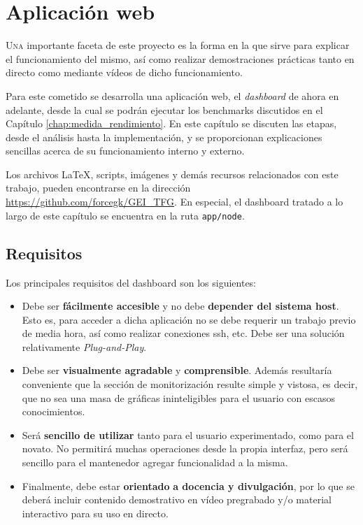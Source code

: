 \chapter{Aplicación web}
\label{chap:aplicacion_web}

\lettrine{U}{na} importante faceta de este proyecto es la forma en la que sirve para explicar el funcionamiento del mismo, así como realizar demostraciones prácticas tanto en directo como mediante vídeos de dicho funcionamiento.

Para este cometido se desarrolla una aplicación web, el \textit{dashboard} de ahora en adelante, desde la cual se podrán ejecutar los benchmarks discutidos en el Capítulo \ref{chap:medida_rendimiento}. En este capítulo se discuten las etapas, desde el análisis hasta la implementación, y se proporcionan explicaciones sencillas acerca de su funcionamiento interno y externo.

Los archivos \LaTeX, scripts, imágenes y demás recursos relacionados con este trabajo, pueden encontrarse en la dirección \url{https://github.com/forcegk/GEI_TFG}. En especial, el dashboard tratado a lo largo de este capítulo se encuentra en la ruta \texttt{app/node}. 

\section{Requisitos}
Los principales requisitos del dashboard son los siguientes:

\begin{itemize}
    \item Debe ser \textbf{fácilmente accesible} y no debe \textbf{depender del sistema host}. Esto es, para acceder a dicha aplicación no se debe requerir un trabajo previo de media hora, así como realizar conexiones \acrshort{ssh}, etc. Debe ser una solución relativamente \textit{Plug-and-Play}.
    \item Debe ser \textbf{visualmente agradable} y \textbf{comprensible}. Además resultaría conveniente que la sección de monitorización resulte simple y vistosa, es decir, que no sea una masa de gráficas ininteligibles para el usuario con escasos conocimientos.
    \item Será \textbf{sencillo de utilizar} tanto para el usuario experimentado, como para el novato. No permitirá muchas operaciones desde la propia interfaz, pero será sencillo para el mantenedor agregar funcionalidad a la misma.
    \item Finalmente, debe estar \textbf{orientado} \textbf{a docencia y divulgación}, por lo que se deberá incluir contenido demostrativo en vídeo pregrabado y/o material interactivo para su uso en directo.
\end{itemize}

